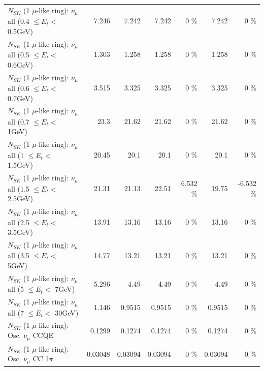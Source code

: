 \begin{table}
\begin{tabular}{| l | r | r | r  r | r  r |}
       $N_{SK}$ (1 $\mu$-like ring): $\nu_{\mu}$ all (0.4 $\leq E_{t} <$ 0.5GeV) &           7.246 &           7.242 &           7.242 &        0 \%  &           7.242 &        0 \%  \\ 
       $N_{SK}$ (1 $\mu$-like ring): $\nu_{\mu}$ all (0.5 $\leq E_{t} <$ 0.6GeV) &           1.303 &           1.258 &           1.258 &        0 \%  &           1.258 &        0 \%  \\ 
       $N_{SK}$ (1 $\mu$-like ring): $\nu_{\mu}$ all (0.6 $\leq E_{t} <$ 0.7GeV) &           3.515 &           3.325 &           3.325 &        0 \%  &           3.325 &        0 \%  \\ 
         $N_{SK}$ (1 $\mu$-like ring): $\nu_{\mu}$ all (0.7 $\leq E_{t} <$ 1GeV) &            23.3 &           21.62 &           21.62 &        0 \%  &           21.62 &        0 \%  \\ 
         $N_{SK}$ (1 $\mu$-like ring): $\nu_{\mu}$ all (1 $\leq E_{t} <$ 1.5GeV) &           20.45 &            20.1 &            20.1 &        0 \%  &            20.1 &        0 \%  \\ 
       $N_{SK}$ (1 $\mu$-like ring): $\nu_{\mu}$ all (1.5 $\leq E_{t} <$ 2.5GeV) &           21.31 &           21.13 &           22.51 &    6.532 \%  &           19.75 &   -6.532 \%  \\ 
       $N_{SK}$ (1 $\mu$-like ring): $\nu_{\mu}$ all (2.5 $\leq E_{t} <$ 3.5GeV) &           13.91 &           13.16 &           13.16 &        0 \%  &           13.16 &        0 \%  \\ 
         $N_{SK}$ (1 $\mu$-like ring): $\nu_{\mu}$ all (3.5 $\leq E_{t} <$ 5GeV) &           14.77 &           13.21 &           13.21 &        0 \%  &           13.21 &        0 \%  \\ 
           $N_{SK}$ (1 $\mu$-like ring): $\nu_{\mu}$ all (5 $\leq E_{t} <$ 7GeV) &           5.296 &            4.49 &            4.49 &        0 \%  &            4.49 &        0 \%  \\ 
          $N_{SK}$ (1 $\mu$-like ring): $\nu_{\mu}$ all (7 $\leq E_{t} <$ 30GeV) &           1.146 &          0.9515 &          0.9515 &        0 \%  &          0.9515 &        0 \%  \\ 
\hline
\hline
                               $N_{SK}$ (1 $\mu$-like ring): Osc. $\nu_\mu$ CCQE &          0.1299 &          0.1274 &          0.1274 &        0 \%  &          0.1274 &        0 \%  \\ 
                          $N_{SK}$ (1 $\mu$-like ring): Osc. $\nu_\mu$ CC 1$\pi$ &         0.03048 &         0.03094 &         0.03094 &        0 \%  &         0.03094 &        0 \%  \\ 

\end{tabular}
\end{table}
